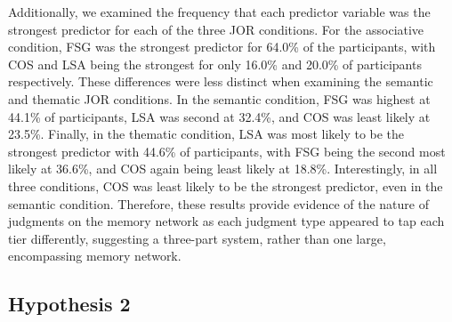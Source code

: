 \documentclass[english,man]{apa6}
\theoremstyle{definition}
\theoremstyle{definition}
\theoremstyle{definition}
\theoremstyle{remark}
\begin{document}
Additionally, we examined the frequency that each predictor variable was
the strongest predictor for each of the three JOR conditions. For the
associative condition, FSG was the strongest predictor for 64.0\% of the
participants, with COS and LSA being the strongest for only 16.0\% and
20.0\% of participants respectively. These differences were less
distinct when examining the semantic and thematic JOR conditions. In the
semantic condition, FSG was highest at 44.1\% of participants, LSA was
second at 32.4\%, and COS was least likely at 23.5\%. Finally, in the
thematic condition, LSA was most likely to be the strongest predictor
with 44.6\% of participants, with FSG being the second most likely at
36.6\%, and COS again being least likely at 18.8\%. Interestingly, in
all three conditions, COS was least likely to be the strongest
predictor, even in the semantic condition. Therefore, these results
provide evidence of the nature of judgments on the memory network as
each judgment type appeared to tap each tier differently, suggesting a
three-part system, rather than one large, encompassing memory network.

\subsection{Hypothesis 2}\label{hypothesis-2}
\end{document}
